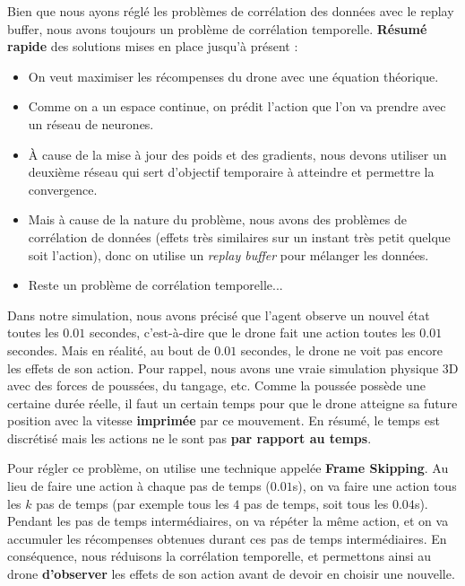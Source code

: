 \documentclass{article}
\begin{document}
Bien que nous ayons réglé les problèmes de corrélation des données avec le replay buffer, nous avons toujours
 un problème de corrélation temporelle.
\textbf{Résumé rapide} des solutions mises en place jusqu'à présent :

\begin{itemize}
    \item On veut maximiser les récompenses du drone avec une équation théorique.
    \item Comme on a un espace continue, on prédit l'action que l'on va prendre avec un réseau de neurones.
    \item À cause de la mise à jour des poids et des gradients, nous devons utiliser un deuxième réseau qui sert d'objectif temporaire à atteindre et permettre la convergence.
    \item Mais à cause de la nature du problème, nous avons des problèmes de corrélation de données (effets très similaires sur un instant très petit quelque soit l'action), 
    donc on utilise un \textit{replay buffer} pour mélanger les données.
    \item Reste un problème de corrélation temporelle...
\end{itemize}


Dans notre simulation, nous avons précisé que l'agent observe un nouvel état toutes les $0.01$ secondes, 
c'est-à-dire que le drone fait une action toutes les $0.01$ secondes.
Mais en réalité, au bout de $0.01$ secondes, le drone ne voit pas encore les effets de son action.
Pour rappel, nous avons une vraie simulation physique 3D avec des forces de poussées, du tangage, etc.
Comme la poussée possède une certaine durée réelle, il faut un certain temps pour que le drone atteigne sa future position avec la vitesse \textbf{imprimée} par ce mouvement.
En résumé, le temps est discrétisé mais les actions ne le sont pas \textbf{par rapport au temps}.

\vspace{0.5cm}

Pour régler ce problème, on utilise une technique appelée \textbf{Frame Skipping}.
Au lieu de faire une action à chaque pas de temps ($0.01$s), on va faire une action tous les $k$ pas de temps
(par exemple tous les $4$ pas de temps, soit tous les $0.04$s).
Pendant les pas de temps intermédiaires, on va répéter la même action, et on va accumuler les récompenses obtenues durant ces pas de temps intermédiaires.
En conséquence, nous réduisons la corrélation temporelle, et permettons ainsi au drone \textbf{d'observer} les effets de son action avant de devoir en choisir une nouvelle.
\end{document}
